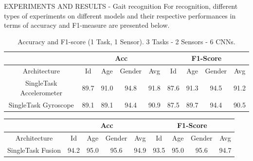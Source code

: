\begin{frame}{EXPERIMENTS AND RESULTS - Gait recognition}
    For recognition, different types of experiments on different models and 
    their respective performances in terms of accuracy and F1-measure are 
    presented below.
    \begin{minipage}{\linewidth}
        \centering
        \begin{minipage}{0.45\linewidth}
            \begin{table}[h!]
            \centering
                \begin{adjustbox}{max width=\textwidth}
                \begin{tabular}{|c||ccc|c||ccc|c|}
                    \hline
                        & \multicolumn{4}{c||}{Acc} & \multicolumn{4}{c|}{F1-Score} \\
                    \hline
                        Architecture & Id & Age & Gender & Avg & Id & Age & Gender & Avg\\
                    \hline
                        SingleTask Accelerometer & 89.7 & 91.0 & 94.8 & 91.8 & 87.6 & 91.3 & 94.5 & 91.2\\
                        SingleTask Gyroscope& 89.1 & 89.1 & 94.4 & 90.9 & 87.5 & 89.7 & 94.4 & 90.5\\
                    \hline 
                \end{tabular}
                \end{adjustbox}
                \caption{Accuracy and F1-score (1 Task, 1 Sensor). 3 Tasks - 2 Sensors - 6 CNNs.}
                \label{table accuracy and F1 (1 Task - 1 Sensor)}
            \end{table}
            \centering
            \begin{table}[h!]
                \centering
                \begin{adjustbox}{max width=\textwidth}
                \begin{tabular}{|c||ccc|c||ccc|c|}
                    \hline
                        & \multicolumn{4}{c||}{Acc} & \multicolumn{4}{c|}{F1-Score} \\
                    \hline
                        Architecture & Id & Age & Gender & Avg & Id & Age & Gender & Avg\\
                    \hline
                        SingleTask Fusion & 94.2 & 95.0 & 95.6 & 94.9 & 93.5 & 95.0 & 95.6 & 94.7\\
                    \hline 
                \end{tabular}

\end{adjustbox}
\end{table}
\end{minipage}
\end{minipage}
\end{frame}
